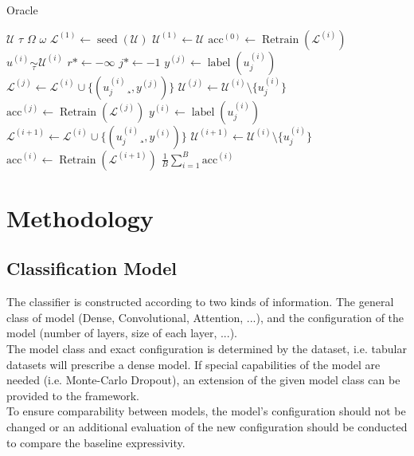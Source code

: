 \documentclass[]{article}
\begin{document}
\begin{algorithm}
	\caption{Oracle}\label{alg:oracle}
	\begin{algorithmic}[1]
		\Require $\mathcal{U}$ 
		\Require $\tau$ 
		\Require $\Omega$ 
		\Require $\omega$ 
		\State $\mathcal{L}^{(1)} \gets \operatorname{seed}(\mathcal{U})$  
		\State $\mathcal{U}^{(1)} \gets \mathcal{U}$
			\State $\text{acc}^{(0)} \gets \operatorname{Retrain}(\mathcal{L}^{(i)})$  
			\State $u^{(i)} \underset{\tau}{\sim} \mathcal{U}^{(i)}$
			\State $r* \gets -\infty$
			\State $j* \gets -1$
				\State $y^{(j)} \gets \operatorname{label}(u^{(i)}_{j})$
				\State $\mathcal{L}^{(j)} \gets \mathcal{L}^{(i)} \cup \{(u^{(i)}_j¸, y^{(j)})\}$
				\State $\mathcal{U}^{(j)} \gets \mathcal{U}^{(i)} \setminus \{u^{(i)}_j\}$
				\State $\text{acc}^{(j)} \gets \operatorname{Retrain}(\mathcal{L}^{(j)})$  
			\EndFor
			\State $y^{(i)} \gets \operatorname{label}(u^{(i)}_{j})$
			\State $\mathcal{L}^{(i+1)} \gets \mathcal{L}^{(i)} \cup \{(u^{(i)}_j¸, y^{(i)})\}$
			\State $\mathcal{U}^{(i+1)} \gets \mathcal{U}^{(i)} \setminus \{u^{(i)}_j\}$
			\State $\text{acc}^{(i)} \gets \operatorname{Retrain}(\mathcal{L}^{(i+1)})$  
		\EndFor
		\State
		\Return $\frac{1}{B} \sum_{i=1}^{B} \text{acc}^{(i)}$
	\end{algorithmic}
\end{algorithm}

\section{Methodology}

\subsection{Classification Model}
The classifier is constructed according to two kinds of information.
The general class of model (Dense, Convolutional, Attention, ...), and the configuration of the model (number of layers, size of each layer, ...). \\
The model class and exact configuration is determined by the dataset, i.e. tabular datasets will prescribe a dense model.
If special capabilities of the model are needed (i.e. Monte-Carlo Dropout), an extension of the given model class can be provided to the framework. \\ [1mm]
To ensure comparability between models, the model's configuration should not be changed or an additional evaluation of the new configuration should be conducted to compare the baseline expressivity.
\end{document}
